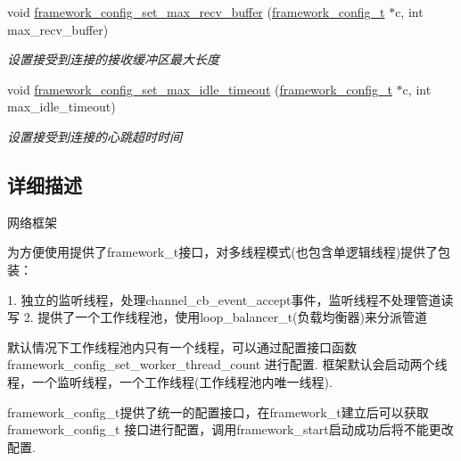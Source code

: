 \begin{DoxyCompactItemize}
void \hyperlink{a00093_ga582e128041da47fa6578aa150b5a615a_ga582e128041da47fa6578aa150b5a615a}{framework\+\_\+config\+\_\+set\+\_\+max\+\_\+recv\+\_\+buffer} (\hyperlink{a00047_a55b26efa9e6ee05514d087ba2593a54b_a55b26efa9e6ee05514d087ba2593a54b}{framework\+\_\+config\+\_\+t} $\ast$c, int max\+\_\+recv\+\_\+buffer)
\begin{DoxyCompactList}\small\item\em 设置接受到连接的接收缓冲区最大长度 \end{DoxyCompactList}\item 
void \hyperlink{a00093_ga22047d5186ce58243e3c4308dd851ab6_ga22047d5186ce58243e3c4308dd851ab6}{framework\+\_\+config\+\_\+set\+\_\+max\+\_\+idle\+\_\+timeout} (\hyperlink{a00047_a55b26efa9e6ee05514d087ba2593a54b_a55b26efa9e6ee05514d087ba2593a54b}{framework\+\_\+config\+\_\+t} $\ast$c, int max\+\_\+idle\+\_\+timeout)
\begin{DoxyCompactList}\small\item\em 设置接受到连接的心跳超时时间 \end{DoxyCompactList}\end{DoxyCompactItemize}


\subsection{详细描述}
网络框架 


\begin{DoxyPre}
为方便使用提供了framework\_t接口，对多线程模式(也包含单逻辑线程)提供了包装：\end{DoxyPre}



\begin{DoxyPre}1. 独立的监听线程，处理channel\_cb\_event\_accept事件，监听线程不处理管道读写
2. 提供了一个工作线程池，使用loop\_balancer\_t(负载均衡器)来分派管道\end{DoxyPre}



\begin{DoxyPre}默认情况下工作线程池内只有一个线程，可以通过配置接口函数framework\_config\_set\_worker\_thread\_count
进行配置. 框架默认会启动两个线程，一个监听线程，一个工作线程(工作线程池内唯一线程).\end{DoxyPre}



\begin{DoxyPre}framework\_config\_t提供了统一的配置接口，在framework\_t建立后可以获取framework\_config\_t
接口进行配置，调用framework\_start启动成功后将不能更改配置.\end{DoxyPre}



